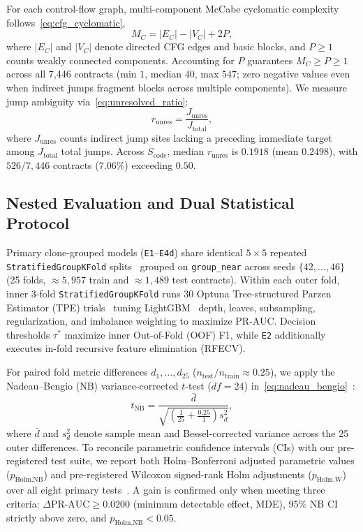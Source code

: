 \documentclass[conference]{IEEEtran}
\begin{document}
For each control-flow graph, multi-component McCabe cyclomatic complexity follows~\eqref{eq:cfg_cyclomatic},
\begin{equation}\label{eq:cfg_cyclomatic}
M_C = |E_C| - |V_C| + 2P,
\end{equation}
where $|E_C|$ and $|V_C|$ denote directed CFG edges and basic blocks, and $P \ge 1$ counts weakly connected components. Accounting for $P$ guarantees $M_C \ge P \ge 1$ across all 7,446 contracts (min $1$, median $40$, max $547$; zero negative values even when indirect jumps fragment blocks across multiple components). We measure jump ambiguity via~\eqref{eq:unresolved_ratio}:
\begin{equation}\label{eq:unresolved_ratio}
r_{\text{unres}} = \frac{J_{\text{unres}}}{J_{\text{total}}},
\end{equation}
where $J_{\text{unres}}$ counts indirect jump sites lacking a preceding immediate target among $J_{\text{total}}$ total jumps. Across $S_{\text{code}}$, median $r_{\text{unres}}$ is $0.1918$ (mean $0.2498$), with $526/7{,}446$ contracts ($7.06\%$) exceeding $0.50$.

\subsection{Nested Evaluation and Dual Statistical Protocol}\label{sec:stats}

Primary clone-grouped models (\texttt{E1}--\texttt{E4d}) share identical $5 \times 5$ repeated \texttt{StratifiedGroupKFold} splits~\cite{pedregosa2011scikit} grouped on \texttt{group\_near} across seeds $\{42, \dots, 46\}$ (25 folds, $\approx 5{,}957$ train and $\approx 1{,}489$ test contracts). Within each outer fold, inner 3-fold \texttt{StratifiedGroupKFold} runs 30 Optuna Tree-structured Parzen Estimator (TPE) trials~\cite{akiba2019optuna} tuning LightGBM~\cite{ke2017lightgbm} depth, leaves, subsampling, regularization, and imbalance weighting to maximize PR-AUC\@. Decision thresholds $\tau^*$ maximize inner Out-of-Fold (OOF) F1, while \texttt{E2} additionally executes in-fold recursive feature elimination (RFECV).

For paired fold metric differences $d_1, \dots, d_{25}$ ($n_{\text{test}}/n_{\text{train}} \approx 0.25$), we apply the Nadeau--Bengio (NB) variance-corrected $t$-test ($df=24$) in~\eqref{eq:nadeau_bengio}~\cite{nadeau2003inference}:
\begin{equation}\label{eq:nadeau_bengio}
t_{\text{NB}} = \frac{\bar{d}}{\sqrt{\left(\frac{1}{25} + \frac{0.25}{1}\right) s_d^2}},
\end{equation}
where $\bar{d}$ and $s_d^2$ denote sample mean and Bessel-corrected variance across the 25 outer differences. To reconcile parametric confidence intervals (CIs) with our pre-registered test suite, we report both Holm--Bonferroni adjusted parametric values ($p_{\text{Holm,NB}}$) and pre-registered Wilcoxon signed-rank Holm adjustments ($p_{\text{Holm,W}}$) over all eight primary tests~\cite{holm1979simple}. A gain is confirmed only when meeting three criteria: $\Delta\text{PR-AUC} \ge 0.0200$ (minimum detectable effect, MDE), 95\% NB CI strictly above zero, and $p_{\text{Holm,NB}} < 0.05$.
\end{document}
